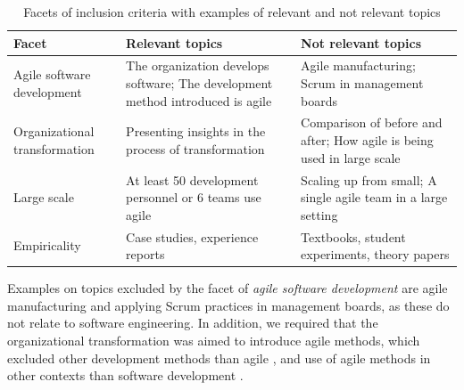 \begin{table}
    \centering
    \begin{tabular}{ >{\raggedright\arraybackslash}p{}
                     >{\raggedright\arraybackslash}p{}
                     >{\raggedright\arraybackslash}p{} }
        \toprule
        Facet  &  Relevant topics  &  Not relevant topics  \\
        \midrule
        Agile software development  & 
                The organization develops software;
                The development method introduced is agile  & 
                
                Agile manufacturing;
                Scrum in management boards  \\
                
        Organizational transformation  &
                Presenting insights in the process of transformation  &
                
                Comparison of before and after;
                How agile is being used in large scale   \\
                
        Large scale    &
                At least 50 development personnel or 6 teams use agile &
                
                Scaling up from small;
                A single agile team in a large setting \\
                
        Empiricality   &
                Case studies, experience reports  &
                
                Textbooks, student experiments, theory papers  \\
        \bottomrule
    \end{tabular}
    \caption{Facets of inclusion criteria with examples of relevant and
             not relevant topics}
    \label{table:facets}
\end{table}

Examples on topics excluded by the facet of \emph{agile software development}
are agile manufacturing and applying Scrum practices in management boards, as
these do not relate to software engineering. In addition, we required that the
organizational transformation was aimed to introduce agile methods, which
excluded other development methods than agile \cite{Sagesser2013}, and use of
agile methods in other contexts than software development \cite{Hodgkins2007}.

